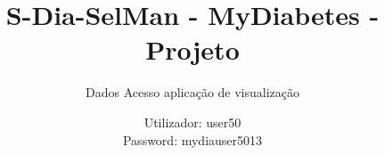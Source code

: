 \documentclass[handout]{beamer}
\title{S-Dia-SelMan - MyDiabetes - Projeto}
\subtitle{Dados Acesso aplicação de visualização}
\author{Utilizador: user50\\
Password: mydiauser5013}
\date{}
\institute{\url{mydiabetes@dcc.fc.up.pt}\\\url{http://mydiabetes.dcc.fc.up.pt/}}
\begin{document}
\begin{frame}[plain,t]
\titlepage
\end{frame}
\end{document}
